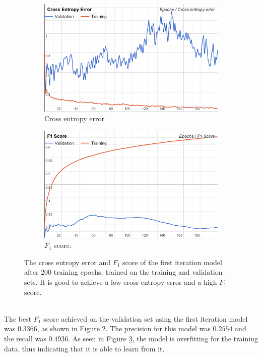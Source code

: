 \begin{figure}[h!]
\begin{subfigure}{0.5\textwidth}
\includegraphics[width=1 \linewidth]{figure/results/first_iter_cross}
\caption{Cross entropy error}
\label{fig:first_iter_overfitting}
\end{subfigure}
\begin{subfigure}{0.5\textwidth}
\includegraphics[width=1\linewidth]{figure/results/first_iter_f1}
\caption{$F_1$ score.}
\label{fig:first_iter_f1}
\end{subfigure}
 
\caption{The cross entropy error and $F_1$ score of the first iteration model after 200 training epochs, trained on the training and validation sets. It is good to achieve a low cross entropy error and a high $F_1$ score.}
\label{fig:first_iter}
\end{figure}
\\
The best $F_1$ score achieved on the validation set using the first iteration model was $0.3366$, as shown in Figure \ref{fig:first_iter_f1}. The precision for this model was $0.2554$ and the recall was $0.4936$. As seen in Figure \ref{fig:first_iter}, the model is overfitting for the training data, thus indicating that it is able to learn from it.
